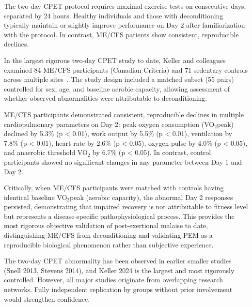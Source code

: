 The two-day CPET protocol requires maximal exercise tests on consecutive days, separated by 24 hours. Healthy individuals and those with deconditioning typically maintain or slightly improve performance on Day 2 after familiarization with the protocol. In contrast, ME/CFS patients show consistent, reproducible declines.

\begin{achievement}
\label{ach:two-day-cpet}
In the largest rigorous two-day CPET study to date, Keller and colleagues examined 84 ME/CFS participants (Canadian Criteria) and 71 sedentary controls across multiple sites~\cite{keller2024cpet}. The study design included a matched subset (55 pairs) controlled for sex, age, and baseline aerobic capacity, allowing assessment of whether observed abnormalities were attributable to deconditioning.

ME/CFS participants demonstrated consistent, reproducible declines in multiple cardiopulmonary parameters on Day 2: peak oxygen consumption (VO$_2$peak) declined by 5.3\% (p < 0.01), work output by 5.5\% (p < 0.01), ventilation by 7.8\% (p < 0.01), heart rate by 2.6\% (p < 0.05), oxygen pulse by 4.0\% (p < 0.05), and anaerobic threshold VO$_2$ by 6.7\% (p < 0.05). In contrast, control participants showed no significant changes in any parameter between Day 1 and Day 2.

Critically, when ME/CFS participants were matched with controls having identical baseline VO$_2$peak (aerobic capacity), the abnormal Day 2 responses persisted, demonstrating that impaired recovery is not attributable to fitness level but represents a disease-specific pathophysiological process. This provides the most rigorous objective validation of post-exertional malaise to date, distinguishing ME/CFS from deconditioning and validating PEM as a reproducible biological phenomenon rather than subjective experience.
\end{achievement}

\begin{warning}
The two-day CPET abnormality has been observed in earlier smaller studies (Snell 2013, Stevens 2014), and Keller 2024 is the largest and most rigorously controlled. However, all major studies originate from overlapping research networks. Fully independent replication by groups without prior involvement would strengthen confidence.
\end{warning}

